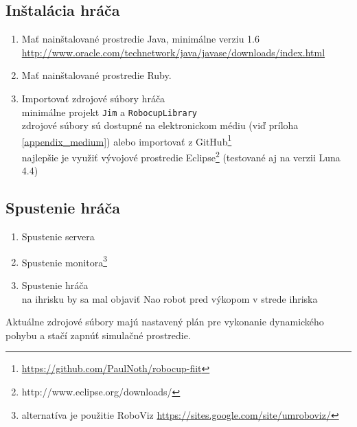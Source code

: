 \subsection{Inštalácia hráča}
\begin{enumerate}
	\item Mať nainštalované prostredie Java, minimálne verziu 1.6
	\\ \url{http://www.oracle.com/technetwork/java/javase/downloads/index.html}
	\item Mať nainštalované prostredie Ruby.
	\item Importovať zdrojové súbory hráča
	\\ minimálne projekt \texttt{Jim} a \texttt{RobocupLibrary}
	\\ zdrojové súbory sú dostupné na elektronickom médiu (viď príloha \ref{appendix_medium}) alebo importovať z GitHub\footnote{\url{https://github.com/PaulNoth/robocup-fiit}}
	\\ najlepšie je využiť vývojové prostredie Eclipse\footnote{http://www.eclipse.org/downloads/} (testované aj na verzii Luna 4.4)
\end{enumerate}

\subsection{Spustenie hráča}
\begin{enumerate}
	\item Spustenie servera
	\item Spustenie monitora\footnote{alternatíva je použitie RoboViz \url{https://sites.google.com/site/umroboviz/}}
	\item Spustenie hráča
	\\ na ihrisku by sa mal objaviť Nao robot pred výkopom v strede ihriska
\end{enumerate}
Aktuálne zdrojové súbory majú nastavený plán pre vykonanie dynamického pohybu a stačí zapnúť simulačné prostredie.